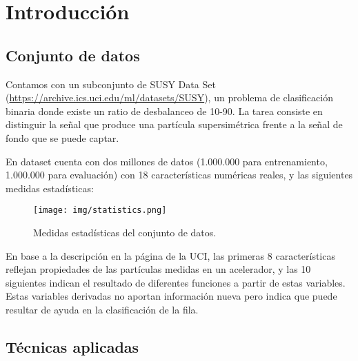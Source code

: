 \section{Introducción}

\subsection{Conjunto de datos}


Contamos con un subconjunto de SUSY Data Set (\url{https://archive.ics.uci.edu/ml/datasets/SUSY}), un problema de clasificación binaria donde existe un ratio de desbalanceo de 10-90. La tarea consiste en distinguir la señal que produce una partícula supersimétrica frente a la señal de fondo que se puede captar.

En dataset cuenta con dos millones de datos (1.000.000 para entrenamiento, 1.000.000 para evaluación) con 18 características numéricas reales, y las siguientes medidas estadísticas:

\begin{figure}[ht]
    \centerfloat
    \texttt{[image: img/statistics.png]}
    \caption{Medidas estadísticas del conjunto de datos.}
\end{figure}

En base a la descripción en la página de la UCI, las primeras 8 características reflejan propiedades de las partículas medidas en un acelerador, y las 10 siguientes indican el resultado de diferentes funciones a partir de estas variables. Estas variables derivadas no aportan información nueva pero indica que puede resultar de ayuda en la clasificación de la fila.

\subsection{Técnicas aplicadas}

